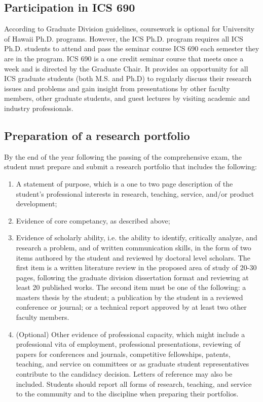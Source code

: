 \documentclass[12pt]{article}
\begin{document}
\subsection*{Participation in ICS 690}

According to Graduate Division guidelines, coursework is optional for
University of Hawaii Ph.D. programs.  However, the ICS Ph.D. program
requires all ICS Ph.D. students to attend and pass the seminar course ICS
690 each semester they are in the program.  ICS 690 is a one credit seminar
course that meets once a week and is directed by the Graduate Chair. It
provides an opportunity for all ICS graduate students (both M.S. and Ph.D)
to regularly discuss their research issues and problems and gain insight
from presentations by other faculty members, other graduate students, and
guest lectures by visiting academic and industry professionals.  

\subsection*{Preparation of a research portfolio}

By the end of the year following the passing of the comprehensive exam, the student
must prepare and submit a research portfolio that includes the following:

\begin{enumerate}
\item A statement of purpose, which is a one to two page description of the
  student's professional interests in research, teaching, service, and/or
  product development;
\item Evidence of core competancy, as described above;
\item Evidence of scholarly ability, i.e. the ability to identify,
  critically analyze, and research a problem, and of written communication
  skills, in the form of two items authored by the student and reviewed by
  doctoral level scholars. The first item is a written literature review in
  the proposed area of study of 20-30 pages, following the graduate
  division dissertation format and reviewing at least 20 published
  works. The second item must be one of the following:  a masters thesis by
  the student; a publication by the student in a reviewed conference or
  journal; or a technical report approved by at least two other faculty
  members. 
\item (Optional) Other evidence of professional capacity, which might
  include a professional vita of employment, professional presentations, reviewing of papers for conferences and journals, competitive fellowships, patents, teaching, and service on committees or as graduate student representatives contribute to the candidacy decision. Letters of reference may also be included. Students should report all forms of research, teaching, and service to the community and to the discipline when preparing their portfolios.
\end{enumerate}
\end{document}
